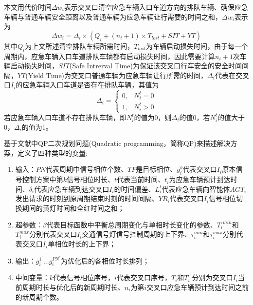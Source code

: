 本文用代价时间${\Delta{w_i}}$表示交叉口清空应急车辆入口车道方向的排队车辆、确保应急车辆与普通车辆安全距离以及普通车辆为应急车辆让行需要的时间之和，${\Delta{w_i}}$表示为
\begin{equation}
	\label{equation:Delta_wi}
	\Delta{w_i}=\Delta_{i}\times(Q_i+(n_i+1) \times T_{lost} + SIT + YT )
\end{equation}
其中${Q_i}$为上文所述清空排队车辆所需时间，${T_{lost}}$为车辆启动损失时间，由于每一个周期内，应急车辆入口车道排队车辆都有启动损失时间，因此需要计算${n_i+1}$次车辆启动损失时间，${SIT}$(Safe Intrerval Time)为保证该交叉口行车安全的安全时间间隔，${YT}$(Yield Time)为交叉口普通车辆为应急车辆让行所需的时间，${\Delta_{i}}$代表在交叉口${I_i}$的应急车辆入口车道是否存在排队车辆，其值为
\begin{equation}
	\Delta_{i}=
	\begin{cases}
		0, & {N_i^t} = 0 \\
		1, & {N_i^t} > 0
	\end{cases}
	\label{equation:Delta_i}
\end{equation}
若应急车辆入口车道不存在排队车辆，即${N_i^t}$的值为0，则${\Delta_{i}}$的值0，若${N_i^t}$的值大于0，${\Delta_{i}}$的值为1。

基于文献\cite{min}中QP二次规划问题(Quadratic programming，简称QP)来描述解决方案，定义了四种类型的变量:
\begin{enumerate}
	\item 输入：${PN}$代表周期中信号相位个数、${TP}$是目标相位、${g_i^k}$代表交叉口${I_i}$原本信号控制方案中第${k}$信号相位时长、${t}$代表当前时间、${t_i}$为应急车辆预计到达时间、${\delta_i}$代表应急车辆到达交叉口${I_i}$的时间偏差、${L_i^t}$代表应急车辆向智能体${AGT_i}$发出请求的时刻到原周期结束时刻的时间间隔、${{YR}_i}$代表交叉口${I_i}$信号相位切换期间的黄灯时间和全红时间之和；
	\item 超参数：${\beta}$代表目标函数中平衡总周期变化与单相时长变化的参数、${{T_i}^{min}}$和${T_i^{max}}$分别代表交叉口${I_i}$交通信号灯信号控制周期的上下界、${\tau_i^{min}}$和${\tau_i^{max}}$分别代表交叉口${I_i}$单相位时长的上下界；
	\item 输出：${g_i^{1^\prime}\ldots{g_i^{PN^\prime}}}$为优化后的各相位时长排列；
	\item 中间变量：${k}$代表信号相位序号，${i}$代表交叉口序号，${T_i}$和${{T_i}^\prime}$分别为交叉口${I_i}$当前周期时长与优化后的新周期时长、${n_i}$为第${i}$交叉口应急车辆预计到达时间之前的新周期个数。
\end{enumerate}

